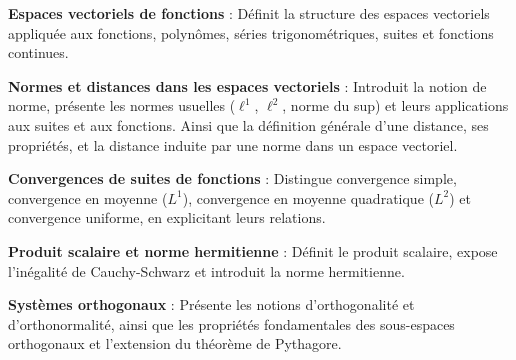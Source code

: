  \label{ch:Quick Summary}

\vspace{2ex} %

\textbf{Espaces vectoriels de fonctions } : Définit la
structure des espaces vectoriels appliquée aux fonctions,
polynômes, séries trigonométriques, suites et fonctions continues.

\textbf{Normes et distances dans les espaces vectoriels } :
Introduit la notion de norme, présente les normes usuelles ($\ell^1$,
$\ell^2$, norme du sup) et leurs applications aux suites et aux fonctions. Ainsi que la
définition générale d’une distance, ses propriétés, et la distance
induite par une norme dans un espace vectoriel.

\textbf{Convergences de suites de fonctions }
: Distingue convergence simple, convergence en moyenne ($L^1$),
convergence en moyenne quadratique ($L^2$) et convergence uniforme,
en explicitant leurs relations.

\textbf{Produit scalaire et norme hermitienne
} : Définit le produit scalaire, expose
l’inégalité de Cauchy-Schwarz et introduit la norme hermitienne.

\textbf{Systèmes orthogonaux } : Présente les
notions d’orthogonalité et d’orthonormalité, ainsi que les propriétés
fondamentales des sous-espaces orthogonaux et l’extension du théorème
de Pythagore.
